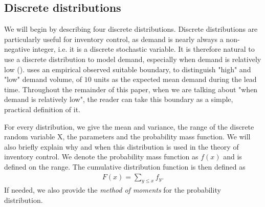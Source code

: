 \documentclass{article}
\begin{document}
\subsection{Discrete distributions}
\begin{flushleft}
    We will begin by describing four discrete distributions.
    Discrete distributions are particularly useful for inventory control, as demand is nearly always a non-negative integer, i.e. it is a discrete stochastic variable.
    It is therefore natural to use a discrete distribution to model demand, especially when demand is relatively low (\cite{RePEc:spr:isorms:978-3-319-15729-0}).
    \cite{silver1998inventory} uses an empirical observed suitable boundary, to distinguish "high" and "low" demand volume, of $10$ units as the expected mean demand during the lead time.
    Throughout the remainder of this paper, when we are talking about "when demand is relatively low", the reader can take this boundary as a simple, practical definition of it.
\end{flushleft}
\begin{flushleft}
    For every distribution, we give the mean and variance, the range of the discrete random variable X, the parameters and the probability mass function.
    We will also briefly explain why and when this distribution is used in the theory of inventory control.
    We denote the probability mass function as $f(x)$ and is defined on the range.
    The cumulative distribution function is then defined as
    \begin{align*}
        F(x) = \sum_{y\le x}^{} f_y.
    \end{align*}
    If needed, we also provide the \textit{method of moments} for the probability distribution.
\end{flushleft}
\end{document}

